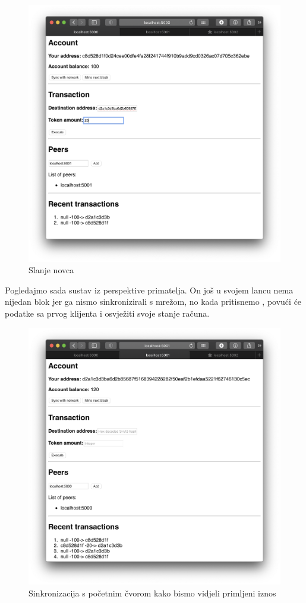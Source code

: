 \documentclass[utf8, zavrsni]{fer}
\begin{document}
\begin{figure}[H]
    \centering
    \includegraphics[width=\textwidth]{transakcija.png}
    \caption{Slanje novca}
    \label{fig:transakcija}
\end{figure}

Pogledajmo sada sustav iz perspektive primatelja. On još u svojem lancu nema nijedan blok jer ga nismo sinkronizirali s mrežom, no kada pritisnemo , povući će podatke sa prvog klijenta i osvježiti svoje stanje računa.

\begin{figure}[H]
    \centering
    \includegraphics[width=\textwidth]{sinkronizacija.png}
    \caption{Sinkronizacija s početnim čvorom kako bismo vidjeli primljeni iznos}
    \label{fig:sinkronizacija}
\end{figure}
\end{document}

